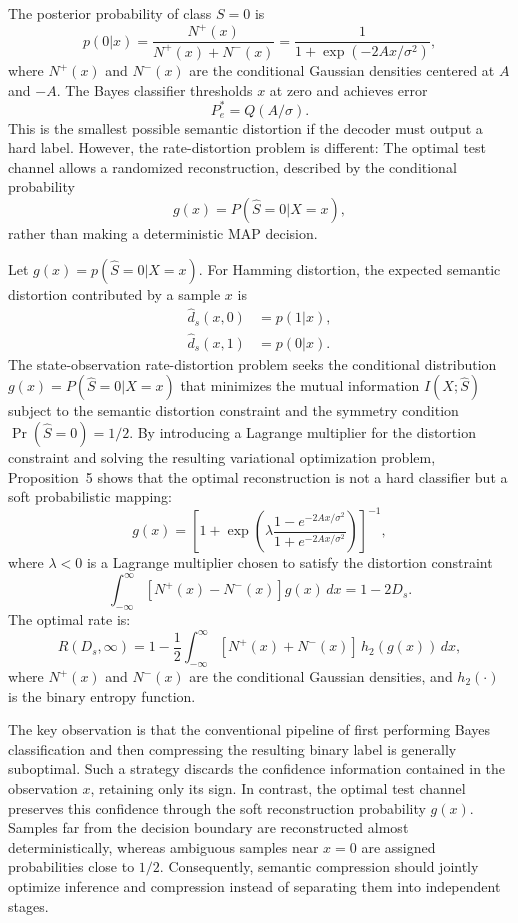 \documentclass[conference]{IEEEtran}
\begin{document}
The posterior probability of class $S=0$ is
\begin{equation}
p(0|x)=\frac{N^+(x)}{N^+(x)+N^-(x)}
       =\frac{1}{1+\exp(-2Ax/\sigma^2)},
\label{eq:posterior}
\end{equation}
where $N^+(x)$ and $N^-(x)$ are the conditional Gaussian densities centered at $A$ and $-A$. The Bayes classifier thresholds $x$ at zero and achieves error
\begin{equation}
P_e^*=Q(A/\sigma).
\end{equation}
This is the smallest possible semantic distortion if the decoder must output a hard label. However, the rate-distortion problem is different: 
The optimal test channel allows a randomized reconstruction,
described by the conditional probability
\[
g(x)=P(\hat S=0|X=x),
\]
rather than making a deterministic MAP decision.

Let $g(x)=p(\hat{S}=0|X=x)$. For Hamming distortion, the expected semantic distortion contributed by a sample $x$ is
\begin{align}
\hat{d}_s(x,0)&=p(1|x),\\
\hat{d}_s(x,1)&=p(0|x).
\end{align}
The state-observation rate-distortion problem seeks the conditional distribution
$g(x)=P(\hat{S}=0|X=x)$
that minimizes the mutual information
$I(X;\hat{S})$
subject to the semantic distortion constraint and the symmetry condition
$\Pr(\hat{S}=0)=1/2$.
By introducing a Lagrange multiplier for the distortion constraint and solving the resulting variational optimization problem, Proposition~5 shows that the optimal reconstruction is not a hard classifier but a soft probabilistic mapping:
\begin{equation}
g(x) = \left[1 + \exp\left(\lambda \frac{1 - e^{-2Ax/\sigma^2}}{1 + e^{-2Ax/\sigma^2}}\right)\right]^{-1},
\end{equation}
where $\lambda < 0$ is a Lagrange multiplier chosen to satisfy the distortion constraint
\begin{equation}
\int_{-\infty}^{\infty} [N^+(x)-N^-(x)]g(x)\,dx=1-2D_s.
\label{eq:lambda-binary}
\end{equation}
The optimal rate is:
\begin{equation}
R(D_s, \infty) = 1 - \frac{1}{2}\int_{-\infty}^{\infty} [N^+(x) + N^-(x)]\, h_2(g(x))\, dx,
\end{equation}
where $N^+(x)$ and $N^-(x)$ are the conditional Gaussian densities, and $h_2(\cdot)$ is the binary entropy function.

The key observation is that the conventional pipeline of first performing Bayes classification and then compressing the resulting binary label is generally suboptimal. Such a strategy discards the confidence information contained in the observation $x$, retaining only its sign. In contrast, the optimal test channel preserves this confidence through the soft reconstruction probability $g(x)$. Samples far from the decision boundary are reconstructed almost deterministically, whereas ambiguous samples near $x=0$ are assigned probabilities close to $1/2$. Consequently, semantic compression should jointly optimize inference and compression instead of separating them into independent stages.
\end{document}
